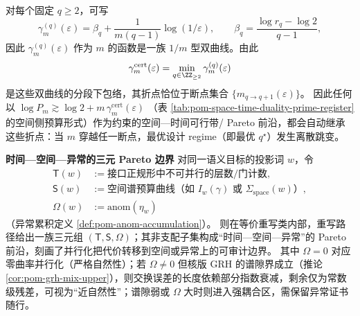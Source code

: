 \begin{remark}
\begin{enumerate}
  对每个固定 \(q\ge 2\)，可写
  \[
  \gamma^{(q)}_m(\varepsilon)=\beta_q+\frac{1}{m(q-1)}\log(1/\varepsilon),
  \qquad
  \beta_q=\frac{\log r_q-\log 2}{q-1},
  \]
  因此 \(\gamma^{(q)}_m(\varepsilon)\) 作为 \(m\) 的函数是一族 \(1/m\) 型双曲线。由此
  \[
  \gamma^{\mathrm{cert}}_m(\varepsilon)=\min_{q\in\ZZ_{\ge 2}}\gamma^{(q)}_m(\varepsilon)
  \]
  是这些双曲线的分段下包络，其折点恰位于断点集合 \(\{m_{q\to q+1}(\varepsilon)\}\)。
  因此任何以
  \(
  \log P_m\gtrsim \log 2+m\,\gamma^{\mathrm{cert}}_m(\varepsilon)
  \)
  （表 \ref{tab:pom-space-time-duality-prime-register} 的空间侧预算形式）作为约束的空间—时间可行带/ Pareto 前沿，都会自动继承这些折点：当 \(m\) 穿越任一断点，最优设计 regime（即最优 \(q^\star\)）发生离散跳变。
\end{enumerate}
\end{remark}



\begin{remark}\label{rem:pom-pareto-ts-omega}
\medskip\noindent\textbf{时间—空间—异常的三元 Pareto 边界}
对同一语义目标的投影词 \(w\)，令
\[
\begin{aligned}
\mathsf T(w)&:=\text{接口正规形中不可并行的层数/门计数},\\
\mathsf S(w)&:=\text{空间谱预算曲线（如 }I_w(\gamma)\text{ 或 }\Sigma_{\mathrm{space}}(w)\text{）},\\
\Omega(w)&:=\mathrm{anom}(\eta_w)
\end{aligned}
\]
（异常累积定义 \ref{def:pom-anom-accumulation}）。
则在等价重写类内部，重写路径给出一族三元组 \((\mathsf T,\mathsf S,\Omega)\)；其非支配子集构成“时间—空间—异常”的 Pareto 前沿，刻画了并行化把代价转移到空间或异常上的可审计边界。
其中 \(\Omega=0\) 对应零曲率并行化（严格自然性）；若 \(\Omega\neq 0\) 但核版 GRH 的谱隙界成立（推论 \ref{cor:pom-grh-mix-upper}），则交换误差的长度依赖部分指数衰减，剩余仅为常数级残差，可视为“近自然性”；谱隙弱或 \(\Omega\) 大时则进入强耦合区，需保留异常证书随行。
\end{remark}

